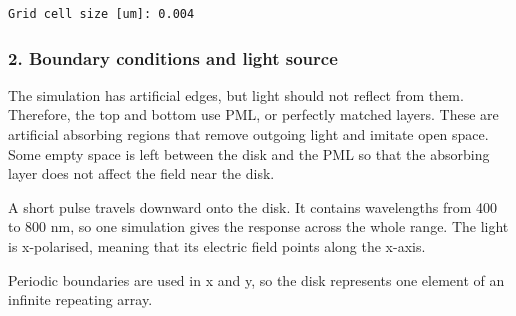\documentclass[11pt]{article}
\begin{document}
    \begin{Verbatim}[commandchars=\\\{\}]
Grid cell size [um]: 0.004
    \end{Verbatim}

    \subsubsection{2. Boundary conditions and light
source}\label{boundary-conditions-and-light-source}

The simulation has artificial edges, but light should not reflect from
them. Therefore, the top and bottom use PML, or perfectly matched
layers. These are artificial absorbing regions that remove outgoing
light and imitate open space. Some empty space is left between the disk
and the PML so that the absorbing layer does not affect the field near
the disk.

A short pulse travels downward onto the disk. It contains wavelengths
from 400 to 800 nm, so one simulation gives the response across the
whole range. The light is x-polarised, meaning that its electric field
points along the x-axis.

Periodic boundaries are used in x and y, so the disk represents one
element of an infinite repeating array.
\end{document}
